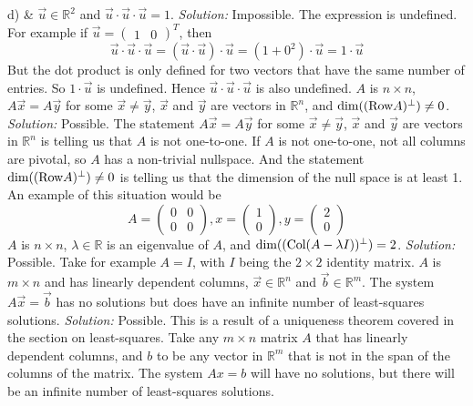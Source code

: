 d) &  
\ifnum {}         
    $\vec u \in \mathbb R^2$ and $\vec u \cdot \vec u \cdot \vec u = 1$.
    \ifnum {} {\color{DarkBlue} \textit{Solution:  } Impossible. The expression is undefined. For example if \setlength{\extrarowheight}{0.00cm} $\vec u = \begin{pmatrix} 1 & 0 \end{pmatrix}^T$, then $$
        \vec u \cdot \vec u \cdot \vec u = (\vec u \cdot \vec u) \cdot \vec u = (1 + 0^2) \cdot \vec u = 1 \cdot \vec u$$ But the dot product is only defined for two vectors that have the same number of entries. So $1 \cdot \vec u$ is undefined. Hence $\vec u \cdot \vec u \cdot \vec u$ is also undefined. } \fi
\fi
\ifnum {}      
    $A$ is $n\times n$, $ A \vec x = A \vec y$ for some $ \vec x \neq \vec y$, $\vec x$ and $\vec y$ are vectors in $\mathbb R ^{n}$, and $\text{dim}( (\text{Row} A)^{\perp}) \ne 0$. 
    \ifnum {} {\color{DarkBlue} \textit{Solution:  } Possible. The statement $ A \vec x = A \vec y$ for some $ \vec x \neq \vec y$, $\vec x$ and $\vec y$ are vectors in $\mathbb R ^{n}$ is telling us that $A$ is not one-to-one.  If $A$ is not one-to-one, not all columns are pivotal, so $A$ has a non-trivial nullspace. And the statement $\text{dim}( (\text{Row} A)^{\perp}) \ne 0$ is telling us that the dimension of the null space is at least 1. An example of this situation would be \setlength{\extrarowheight}{0.0cm} $$A = \begin{pmatrix} 0&0\\0&0\end{pmatrix}, x = \begin{pmatrix} 1\\0\end{pmatrix}, y = \begin{pmatrix} 2\\0\end{pmatrix}$$} \fi
\fi    
\ifnum {}  
    $A$ is $n\times n$, $\lambda \in \mathbb R$ is an eigenvalue of $A$, and $\text{dim}((\text{Col}(A - \lambda I))^{\perp}) = 2$. 
    \ifnum {} {\color{DarkBlue} \textit{Solution:  } Possible. Take for example $A = I$, with $I$ being the $2\times 2$ identity matrix. } \fi
\fi    
\ifnum {}    
    $A$ is $m\times n$ and has linearly dependent columns, $\vec x \in \mathbb R^n$ and $\vec b \in \mathbb R^m$. The system $A\vec x = \vec b$ has no solutions but does have an infinite number of least-squares solutions.
    \ifnum {} {\color{DarkBlue} \textit{Solution:  } Possible. This is a result of a uniqueness theorem covered in the section on least-squares. Take any $m\times n$ matrix $A$ that has linearly dependent columns, and $b$ to be any vector in $\mathbb R^m$ that is not in the span of the columns of the matrix. The system $Ax=b$ will have no solutions, but there will be an infinite number of least-squares solutions. } \fi
